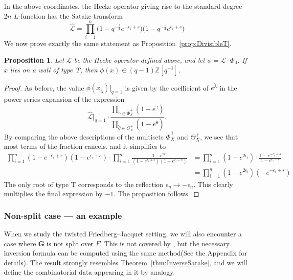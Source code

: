 \documentclass{amsart}
\newtheorem{prop}[theorem]{Proposition}
\theoremstyle{definition}
\theoremstyle{remark}
\newcommand{\1}{\mathbf{1}}
\newcommand{\sh}[1]{\mathcal{#1}}
\newcommand{\Z}{\mathbb{Z}}
\theoremstyle{definition}
\newcommand{\bG}{\mathbf{G}}
\begin{document}
In the above coordinates, the Hecke operator giving rise to the standard degree $2n$ $L$-function has the Satake transform
\[
  \hat{\sh{L}}=\prod_{i=1}^n\Big(1-q^{-\frac{1}{2}}e^{-\epsilon_i+s}\Big)\Big(1-q^{-\frac{1}{2}}e^{\epsilon_i+s}\Big)
\]
We now prove exactly the same statement as Proposition~\ref{prop:DivisibleT}.
\begin{prop}\label{prop:DivisibleFJ}
  Let $\sh{L}$ be the Hecke operator defined above, and let $\phi=\sh{L}\cdot\Phi_0$. If $x$ lies on a wall of type T, then $\phi(x)\in (q-1)\Z[q^{-1}]$.
\end{prop}
\begin{proof}
  As before, the value $\phi(x_{\check{\lambda}})|_{q=1}$ is given by the coefficient of $e^{\check{\lambda}}$ in the power series expansion of the expression
  \[
    \hat{\sh{L}}|_{q=1}\cdot\frac{\prod_{\check{\gamma}\in\check{\Phi}_X^+}(1-e^{\check{\gamma}})}{\prod_{\check{\theta}\in\Theta_X^+}(1-e^{\check{\theta}})}.
  \]
  By comparing the above descriptions of the multisets $\check{\Phi}_X^+$ and $\Theta_X^+$, we see that most terms of the fraction cancels, and it simplifies to
  \begin{align*}
    \prod_{i=1}^n(1-e^{-\epsilon_i+s})(1-e^{\epsilon_i+s})\cdot\prod_{i=1}^n\frac{1-e^{2\epsilon_i}}{(1-e^{\epsilon_i+s})(1-e^{\epsilon_i-s})}&=\prod_{i=1}^n (1-e^{2\epsilon_i})\cdot\frac{1-e^{-\epsilon_i+s}}{1-e^{\epsilon_i-s}}\\
    &=\prod_{i=1}^n(1-e^{2\epsilon_i})(-e^{-\epsilon_i+s})
  \end{align*}
  The only root of type T corresponds to the reflection $\epsilon_n\mapsto -\epsilon_n$. This clearly multiplies the final expression by $-1$. The proposition follows.
\end{proof}

\subsubsection{Non-split case --- an example}\label{ss:NonSplit}
When we study the twisted Friedberg--Jacquet setting, we will also encounter a case where $\bG$ is not split over $F$. This is not covered by \cite{SakSpherical}, but the necessary inversion formula can be computed using the same method(See the Appendix for details). The result strongly resembles Theorem~\ref{thm:InverseSatake}, and we will define the combinatorial data appearing in it by analogy.
\end{document}
